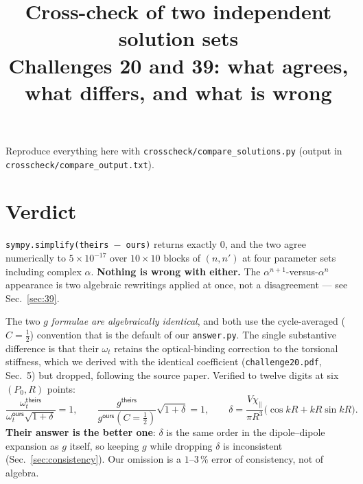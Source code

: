\documentclass[11pt,a4paper]{article}
\title{\bfseries Cross-check of two independent solution sets\\[2pt]
\large Challenges 20 and 39: what agrees, what differs, and what is wrong}
\author{}
\date{}
\newcommand{\ours}{\textsf{ours}}
\newcommand{\theirs}{\textsf{theirs}}
\begin{document}
\maketitle
\vspace{-2.2\baselineskip}

\begin{center}\small
Reproduce everything here with \texttt{crosscheck/compare\_solutions.py}
(output in \texttt{crosscheck/compare\_output.txt}).
\end{center}

\section*{Verdict}

\begin{tcolorbox}[colback=green!4,colframe=green!35!black,
  title=Challenge 39 --- the two answers are the \emph{same expression}]
\texttt{sympy.simplify(theirs $-$ ours)} returns exactly $0$, and the two agree
numerically to $5\times10^{-17}$ over $10\times10$ blocks of $(n,n')$ at four
parameter sets including complex $\alpha$.  \textbf{Nothing is wrong with
either.}  The $\alpha^{n+1}$-versus-$\alpha^{n}$ appearance is two algebraic
rewritings applied at once, not a disagreement --- see Sec.~\ref{sec:39}.
\end{tcolorbox}

\begin{tcolorbox}[colback=orange!5,colframe=orange!60!black,
  title=Challenge 20 --- same physics; their $\omega_t$ keeps one term ours drops]
The two $g$ \emph{formulae are algebraically identical}, and both use the
cycle-averaged ($C=\tfrac12$) convention that is the default of our
\texttt{answer.py}.  The single substantive difference is that their
$\omega_t$ retains the optical-binding correction to the torsional stiffness,
which we derived with the identical coefficient
(\texttt{challenge20.pdf}, Sec.~5) but dropped, following the source paper.
Verified to twelve digits at six $(P_0,R)$ points:
\[
  \frac{\omega_t^{\theirs}}{\omega_t^{\ours}\sqrt{1+\delta}}=1,
  \qquad
  \frac{g^{\theirs}}{g^{\ours}(C=\tfrac12)}\sqrt{1+\delta}=1,
  \qquad
  \delta=\frac{V\chi_{\parallel}}{\pi R^{3}}\bigl(\cos kR+kR\sin kR\bigr).
\]
\textbf{Their answer is the better one}: $\delta$ is the same order in the
dipole--dipole expansion as $g$ itself, so keeping $g$ while dropping $\delta$
is inconsistent (Sec.~\ref{sec:consistency}).  Our omission is a
$1$--$3\,\%$ error of consistency, not of algebra.
\end{tcolorbox}
\end{document}
